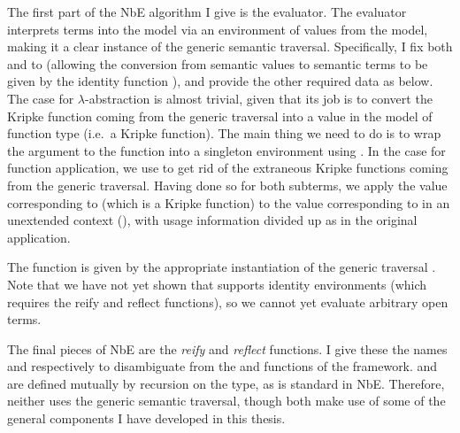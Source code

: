 The first part of the NbE algorithm I give is the evaluator.
The evaluator interprets terms into the model via an environment of values from
the model, making it a clear instance of the generic semantic traversal.
Specifically, I fix both \AgdaBound{$\V$} and \AgdaBound{$\C$} to
\AgdaFunction{\_$\vDash$\_} (allowing the conversion from semantic values to
semantic terms to be given by the identity function ), and
provide the other required data as below.
The case for $\lambda$-abstraction is almost trivial, given that its job is to
convert the Kripke function  coming from the generic traversal into
a value in the model of function type (i.e.\ a Kripke function).
The main thing we need to do is to wrap the argument to the function into a
singleton environment using .
In the case for function application, we use  to get rid of
the extraneous Kripke functions coming from the generic traversal.
Having done so for both subterms, we apply the value corresponding to
 (which is a Kripke function) to the value corresponding to
 in an unextended context (), with usage
information divided up as in the original application.


The function  is given by the appropriate instantiation of
the generic traversal .
Note that we have not yet shown that \AgdaFunction{\_$\vDash$\_} supports
identity environments (which requires the reify and reflect functions), so we
cannot yet evaluate arbitrary open terms.


The final pieces of NbE are the \emph{reify} and \emph{reflect} functions.
I give these the names  and 
respectively to disambiguate from the  and
 functions of the framework.
 and  are defined mutually by
recursion on the type, as is standard in NbE.
Therefore, neither uses the generic semantic traversal, though both make use of
some of the general components I have developed in this thesis.

